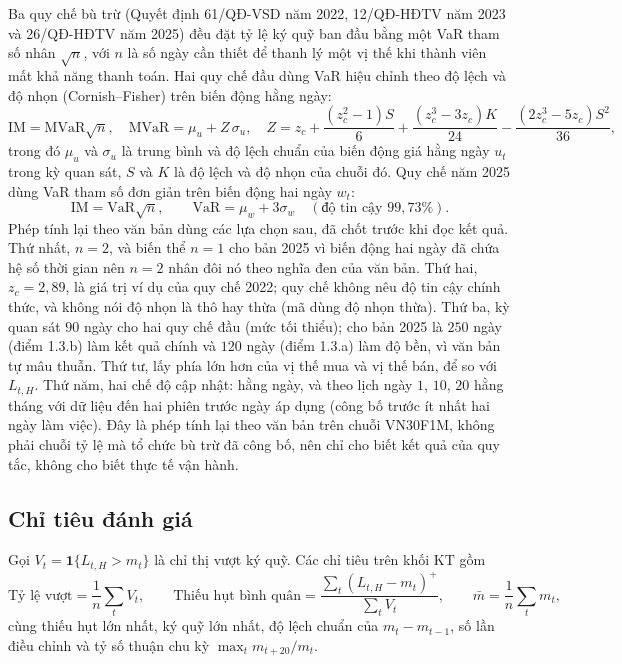 \documentclass[12pt,a4paper]{article}
\theoremstyle{definition}
\theoremstyle{remark}
\newcommand{\ind}{\mathbf{1}}
\newcommand{\KT}{\mathrm{KT}}
\begin{document}
Ba quy chế bù trừ (Quyết định 61/QĐ-VSD năm 2022, 12/QĐ-HĐTV năm 2023 và 26/QĐ-HĐTV năm 2025) đều đặt tỷ lệ ký quỹ ban đầu bằng một VaR tham số nhân $\sqrt n$, với $n$ là số ngày cần thiết để thanh lý một vị thế khi thành viên mất khả năng thanh toán. Hai quy chế đầu dùng VaR hiệu chỉnh theo độ lệch và độ nhọn (Cornish--Fisher) trên biến động hằng ngày:
\begin{equation*}
\text{IM}=\text{MVaR}\sqrt n,\quad \text{MVaR}=\mu_u+Z\,\sigma_u,\quad Z=z_c+\frac{(z_c^2-1)S}{6}+\frac{(z_c^3-3z_c)K}{24}-\frac{(2z_c^3-5z_c)S^2}{36},
\end{equation*}
trong đó $\mu_u$ và $\sigma_u$ là trung bình và độ lệch chuẩn của biến động giá hằng ngày $u_t$ trong kỳ quan sát, $S$ và $K$ là độ lệch và độ nhọn của chuỗi đó. Quy chế năm 2025 dùng VaR tham số đơn giản trên biến động hai ngày $w_t$:
\begin{equation*}
\text{IM}=\text{VaR}\sqrt n,\qquad \text{VaR}=\mu_w+3\sigma_w\quad(\text{độ tin cậy }99{,}73\%).
\end{equation*}
Phép tính lại theo văn bản dùng các lựa chọn sau, đã chốt trước khi đọc kết quả. Thứ nhất, $n=2$, và biến thể $n=1$ cho bản 2025 vì biến động hai ngày đã chứa hệ số thời gian nên $n=2$ nhân đôi nó theo nghĩa đen của văn bản. Thứ hai, $z_c=2{,}89$, là giá trị ví dụ của quy chế 2022; quy chế không nêu độ tin cậy chính thức, và không nói độ nhọn là thô hay thừa (mã dùng độ nhọn thừa). Thứ ba, kỳ quan sát $90$ ngày cho hai quy chế đầu (mức tối thiểu); cho bản 2025 là $250$ ngày (điểm 1.3.b) làm kết quả chính và $120$ ngày (điểm 1.3.a) làm độ bền, vì văn bản tự mâu thuẫn. Thứ tư, lấy phía lớn hơn của vị thế mua và vị thế bán, để so với $L_{t,H}$. Thứ năm, hai chế độ cập nhật: hằng ngày, và theo lịch ngày $1$, $10$, $20$ hằng tháng với dữ liệu đến hai phiên trước ngày áp dụng (công bố trước ít nhất hai ngày làm việc). Đây là phép tính lại theo văn bản trên chuỗi VN30F1M, không phải chuỗi tỷ lệ mà tổ chức bù trừ đã công bố, nên chỉ cho biết kết quả của quy tắc, không cho biết thực tế vận hành.

\subsection{Chỉ tiêu đánh giá}\label{sec:danhgiakyquy}

Gọi $V_t=\ind\{L_{t,H}>m_t\}$ là chỉ thị vượt ký quỹ. Các chỉ tiêu trên khối $\KT$ gồm
\begin{equation}
\text{Tỷ lệ vượt}=\frac1n\sum_tV_t,\qquad
\text{Thiếu hụt bình quân}=\frac{\sum_t(L_{t,H}-m_t)^{+}}{\sum_tV_t},\qquad
\bar m=\frac1n\sum_tm_t,
\end{equation}
cùng thiếu hụt lớn nhất, ký quỹ lớn nhất, độ lệch chuẩn của $m_t-m_{t-1}$, số lần điều chỉnh và tỷ số thuận chu kỳ $\max_t m_{t+20}/m_t$.
\end{document}
